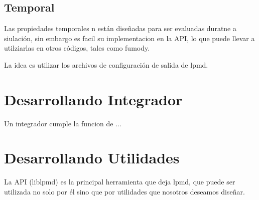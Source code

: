\subsection{Temporal}

Las propiedades temporales n est\'an dise\~nadas para ser evaluadas duratne a siulaci\'on, sin embargo es facil su implementacion en la API, lo que puede llevar a utilziarlas en otros c\'odigos, tales como fumody.

La idea es utilizar los archivos de configuraci\'on de salida de lpmd.

\section{Desarrollando Integrador}

Un integrador cumple la funcion de ...

\section{Desarrollando Utilidades}

La API (liblpmd) es la principal herramienta que deja lpmd, que puede ser utilizada no solo por \'el sino que por utilidades que nosotros deseamos dise\~nar.

